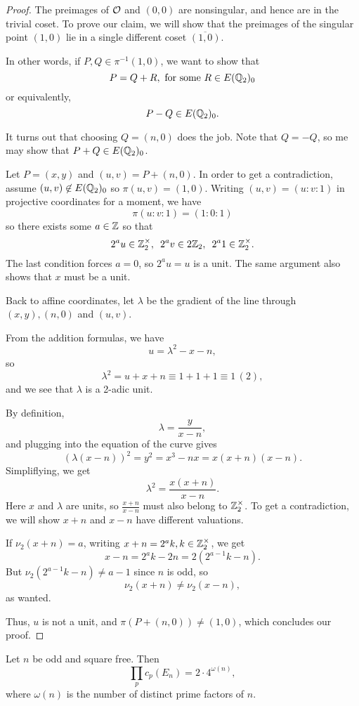 \documentclass[12pt, a4paper]{report}
\begin{document}
\begin{proof}
  The preimages of ${\mathcal O}$ and $(0,0)$ are nonsingular, and hence are in the
  trivial coset.
  To prove
  our claim, we will show that the preimages of the singular point $(1,0)$ lie
  in a single different coset $\overline{(1,0)}.$

  In other words, if $P, Q \in \pi^{-1}(1,0)$, we want to show that
  \[P = Q + R, \text{ for some } R \in E({\mathbb Q}_2)_0 \]
  or equivalently, 
  \[P - Q \in E({\mathbb Q}_2)_0.\]

  It turns out that choosing $Q = (n,0)$ does the job. Note that $Q = -Q$, so me
  may show that $P+Q \in E({\mathbb Q}_2)_0$.

  Let $P = (x,y)$ and $(u,v) = P + (n,0)$. In order to get a contradiction, assume
  $(u,v) \not\in E({\mathbb Q}_2)_0$ so $\pi(u,v) = (1,0)$. Writing $(u,v) = (u:v:1)$ in
  projective coordinates for a moment, we have
  \[\pi(u:v:1) = (1:0:1)\]
  so there exists some $a \in {\mathbb Z}$ so that
  \[2^a u \in {\mathbb Z}_2^\times, \,\,\, 2^av \in 2{\mathbb Z}_2, \,\,\, 2^a1 \in {\mathbb Z}_2^\times.\]
  The last condition forces $a = 0$, so $2^au = u$ is a unit. The same argument
  also shows that $x$ must be a unit.
  
  Back to affine coordinates, let $\lambda$ be the gradient of the
  line through $(x,y), (n,0)$ and $(u,v)$.

  From the addition formulas, we have
  \[u = \lambda^2 - x - n,\]
  so $$\lambda^2 = u + x + n \equiv 1 + 1 + 1 \equiv 1 \, (2),$$ and we see that $\lambda$
  is a 2-adic unit.

  By definition, 
  \[\lambda = \frac{y}{x-n}, \]
  and plugging into the equation of the curve gives 
  \[(\lambda(x-n))^2 = y^2 = x^3 -nx = x(x+n)(x-n).\]
  Simpliflying, we get
  \[\lambda^2 = \frac{x(x+n)}{x-n}.\]
  Here $x$ and $\lambda$ are units, so $\frac{x+n}{x-n}$ must also belong to ${\mathbb Z}_2^\times$.
  To get a contradiction, we will show $x+n$ and $x-n$ have different valuations.

  If $\nu_2(x+n) = a$, writing $x+n = 2^ak, k
  \in {\mathbb Z}_2^\times$, we get
  \[x-n = 2^ak -2n = 2(2^{a-1}k - n).\]
  But $\nu_2(2^{a-1}k-n) \neq a-1$ since $n$ is odd, so
  \[\nu_2(x+n) \neq \nu_2(x-n),\]
  as wanted.

  Thus, $u$ is not a unit, and $\pi(P+(n,0)) \neq (1,0)$, which concludes our proof.
\end{proof}

\begin{cor}
  Let $n$ be odd and square free. Then
  \[\prod\limits_p c_p(E_n) = 2 \cdot 4^{\omega(n)}, \]
  where $\omega(n)$ is the number of distinct prime factors of $n$.
\end{cor}
\end{document}
